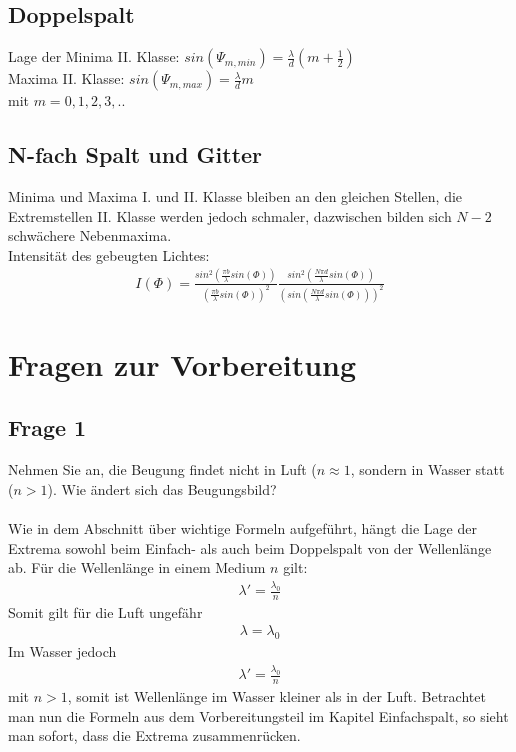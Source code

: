 \documentclass[a4paper,10pt]{scrartcl}
\begin{document}
		\subsection{Doppelspalt}
			Lage der Minima II. Klasse: \(sin(\Psi_{m,min})=\frac{\lambda}{d}(m+\frac{1}{2})\)\\
			Maxima II. Klasse: \(sin(\Psi_{m,max})=\frac{\lambda}{d}m\)\\
			mit \(m=0,1,2,3,..\)
			
		\subsection{N-fach Spalt und Gitter}
			Minima und Maxima I. und II. Klasse bleiben an den gleichen Stellen, die Extremstellen II. Klasse werden jedoch schmaler, dazwischen bilden sich \(N-2\) schwächere Nebenmaxima.\\
			Intensität des gebeugten Lichtes: 
			\begin{align*}
			I(\Phi)=\frac{sin^{2}(\frac{\pi b}{\lambda}sin(\Phi))}{(\frac{\pi b}{\lambda}sin(\Phi))^{2}}\frac{sin^{2}(\frac{N\pi d}{\lambda}sin(\Phi))}{(sin(\frac{N\pi d}{\lambda}sin(\Phi)))^{2}}
			\end{align*}
		
		


	\section{Fragen zur Vorbereitung}
		\subsection{Frage 1}
		Nehmen Sie an, die Beugung findet nicht in Luft (\(n\approx1\), sondern in Wasser statt (\(n>1\)). Wie
		ändert sich das Beugungsbild?\\
		\\
		Wie in dem Abschnitt über wichtige Formeln aufgeführt, hängt die Lage der Extrema sowohl beim Einfach- als auch beim Doppelspalt von der Wellenlänge ab. Für die Wellenlänge in einem Medium \(n\) gilt: 
		\begin{align*}
		\lambda '= \frac{\lambda_{0}}{n}
		\end{align*}
		Somit gilt für die Luft ungefähr
		\begin{align*}
		\lambda = \lambda_{0}
		\end{align*}
		Im Wasser jedoch
		\begin{align*}
		\lambda '= \frac{\lambda_{0}}{n}
		\end{align*}
		mit \(n>1\), somit ist Wellenlänge im Wasser kleiner als in der Luft. Betrachtet man nun die Formeln aus dem Vorbereitungsteil im Kapitel Einfachspalt, so sieht man sofort, dass die Extrema zusammenrücken.
		
\end{document}
